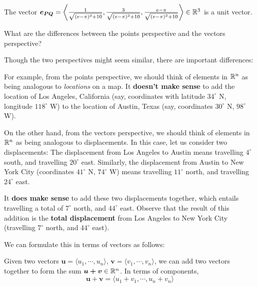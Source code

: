     \begin{example}
    The vector $\bm{e_{PQ}} = \left\langle \frac{1}{\sqrt{(e-\pi)^2+10}}, \frac{3}{\sqrt{(e-\pi)^2+10}}, \frac{e-\pi}{\sqrt{(e-\pi)^2+10}} \right\rangle \in \mathbb{R}^3$ is a unit vector.
    \end{example}



\begin{motivating}
What are the differences between the points perspective and the vectors perspective?
\end{motivating}

Though the two perspectives might seem similar, there are important differences:

For example, from the points perspective, we should think of elements in $\mathbb{R}^n$ as being analogous to \textit{locations} on a map.  It \textbf{doesn't make sense} to add the location of Los Angeles, California (say, coordinates with latitude $34^\circ$ N, longitude $118^\circ$ W) to the location of Austin, Texas (say, coordinates $30^\circ$ N, $98^\circ$ W).

On the other hand, from the vectors perspective, we should think of elements in $\mathbb{R}^n$ as being analogous to displacements.  In this case, let us consider two displacements:
The displacement from Los Angeles to Austin means travelling $4^\circ$ south, and travelling $20^\circ$ east. Similarly, the displacement from Austin to New York City (coordinates $41^\circ$ N, $74^\circ$ W) means travelling $11^\circ$ north, and travelling $24^\circ$ east.

It \textbf{does make sense} to add these two displacements together, which entails travelling a total of $7^\circ$ north, and $44^\circ$ east.  Observe that the result of this addition is the \textbf{total displacement} from Los Angeles to New York City (travelling $7^\circ$ north, and $44^\circ$ east).

We can formulate this in terms of vectors as follows:

\begin{definition}

 Given two vectors $\bm{u} = \langle u_1, \cdots, u_n \rangle$, $\bm{v} = \langle v_1, \cdots, v_n \rangle$, we can add  two vectors together to form the sum $\bm{u+v} \in \mathbb{R}^n$.  In terms of components,
$$\bm{u+v} = \langle u_1+v_1, \cdots, u_n+v_n \rangle$$

\end{definition}

